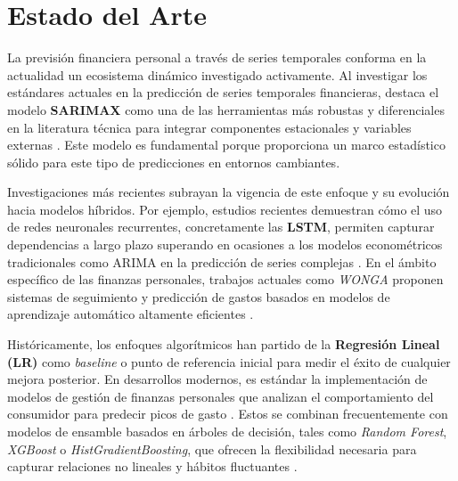 \section{Estado del Arte}
La previsión financiera personal a través de series temporales conforma en la actualidad un ecosistema dinámico investigado activamente. Al investigar los estándares actuales en la predicción de series temporales financieras, destaca el modelo \textbf{SARIMAX} como una de las herramientas más robustas y diferenciales en la literatura técnica para integrar componentes estacionales y variables externas \cite{banas2021}. Este modelo es fundamental porque proporciona un marco estadístico sólido para este tipo de predicciones en entornos cambiantes.

Investigaciones más recientes subrayan la vigencia de este enfoque y su evolución hacia modelos híbridos. Por ejemplo, estudios recientes demuestran cómo el uso de redes neuronales recurrentes, concretamente las \textbf{LSTM}, permiten capturar dependencias a largo plazo superando en ocasiones a los modelos econométricos tradicionales como ARIMA en la predicción de series complejas \cite{kuznetsov2026}. En el ámbito específico de las finanzas personales, trabajos actuales como \textit{WONGA} proponen sistemas de seguimiento y predicción de gastos basados en modelos de aprendizaje automático altamente eficientes \cite{uyanahewa2023}.

Históricamente, los enfoques algorítmicos han partido de la \textbf{Regresión Lineal (LR)} como \textit{baseline} o punto de referencia inicial para medir el éxito de cualquier mejora posterior. En desarrollos modernos, es estándar la implementación de modelos de gestión de finanzas personales que analizan el comportamiento del consumidor para predecir picos de gasto \cite{kooti2016, kaushik2024}. Estos se combinan frecuentemente con modelos de ensamble basados en árboles de decisión, tales como \textit{Random Forest}, \textit{XGBoost} o \textit{HistGradientBoosting}, que ofrecen la flexibilidad necesaria para capturar relaciones no lineales y hábitos fluctuantes \cite{pavithra2025}.